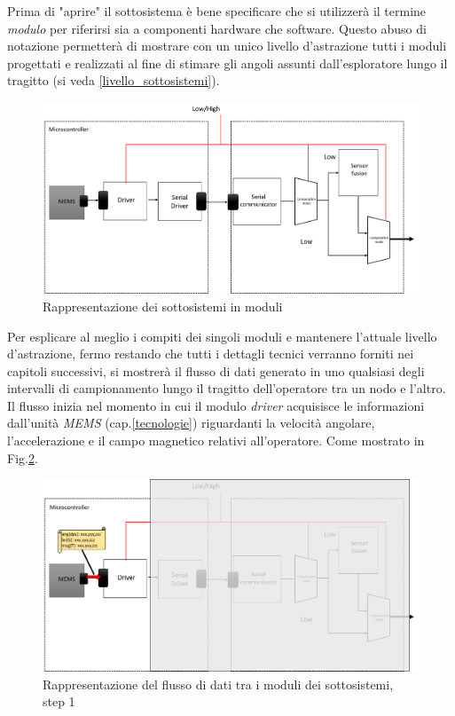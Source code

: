 Prima di "aprire" il sottosistema è bene specificare che si utilizzerà il termine \textit{modulo} per riferirsi sia a componenti hardware che software. Questo abuso di notazione permetterà di mostrare con un unico livello d'astrazione tutti i moduli progettati e realizzati al fine di stimare gli angoli assunti dall'esploratore lungo il tragitto (si veda \ref{livello_sottosistemi}).
\begin{figure}[H]  
\includegraphics[scale=0.3 ]{DescrizioneDelSistema/sistema_liv2.png}
\caption{Rappresentazione dei sottosistemi in moduli}
\label{fig:sistema_liv2}
\end{figure}
Per esplicare al meglio i compiti dei singoli moduli e mantenere l'attuale livello d'astrazione, fermo restando che tutti i dettagli tecnici verranno forniti nei capitoli successivi, si mostrerà il flusso di dati generato in uno qualsiasi degli intervalli di campionamento lungo il tragitto dell'operatore tra un nodo e l'altro.\\ 
Il flusso inizia nel momento in cui il modulo \textit{driver} acquisisce le informazioni dall'unità \textit{MEMS} (cap.\ref{tecnologie}) riguardanti la velocità angolare, l'accelerazione e il campo magnetico relativi all'operatore. Come mostrato in Fig.\ref{fig:flusso1}. 
\begin{figure}[H] 
	\centering 
	\includegraphics[scale=0.25 ]{DescrizioneDelSistema/flusso1.png}
	\caption{Rappresentazione del flusso di dati tra i moduli dei sottosistemi, step 1}
	\label{fig:flusso1}
\end{figure}
